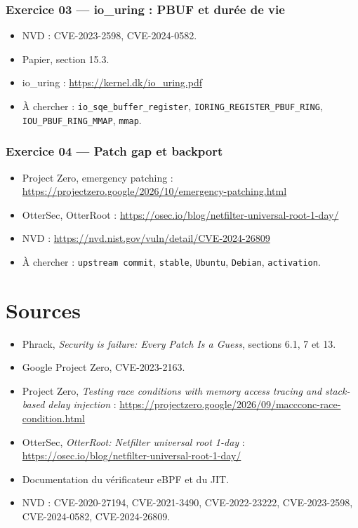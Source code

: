 \documentclass{training}
\begin{document}
\subsection*{Exercice 03 --- io\_uring : PBUF et durée de vie}
\begin{itemize}
  \item NVD : CVE-2023-2598, CVE-2024-0582.
  \item Papier, section 15.3.
  \item io\_uring : \url{https://kernel.dk/io_uring.pdf}
  \item À chercher : \texttt{io\_sqe\_buffer\_register},
        \texttt{IORING\_REGISTER\_PBUF\_RING}, \texttt{IOU\_PBUF\_RING\_MMAP},
        \texttt{mmap}.
\end{itemize}

\subsection*{Exercice 04 --- Patch gap et backport}
\begin{itemize}
  \item Project Zero, emergency patching :
        \url{https://projectzero.google/2026/10/emergency-patching.html}
  \item OtterSec, OtterRoot :
        \url{https://osec.io/blog/netfilter-universal-root-1-day/}
  \item NVD : \url{https://nvd.nist.gov/vuln/detail/CVE-2024-26809}
  \item À chercher : \texttt{upstream commit}, \texttt{stable},
        \texttt{Ubuntu}, \texttt{Debian}, \texttt{activation}.
\end{itemize}

\chapter{Sources}
\begin{itemize}
  \item Phrack, \emph{Security is failure: Every Patch Is a Guess},
        sections 6.1, 7 et 13.
  \item Google Project Zero, CVE-2023-2163.
  \item Project Zero, \emph{Testing race conditions with memory access
        tracing and stack-based delay injection} :
        \url{https://projectzero.google/2026/09/maccconc-race-condition.html}
  \item OtterSec, \emph{OtterRoot: Netfilter universal root 1-day} :
        \url{https://osec.io/blog/netfilter-universal-root-1-day/}
  \item Documentation du vérificateur eBPF et du JIT.
  \item NVD : CVE-2020-27194, CVE-2021-3490, CVE-2022-23222,
        CVE-2023-2598, CVE-2024-0582, CVE-2024-26809.
\end{itemize}

\end{document}
